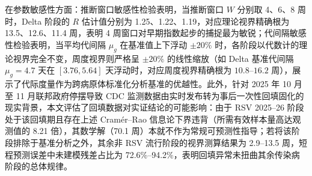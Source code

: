 \documentclass[11pt,a4paper]{article}
\theoremstyle{plain}
\theoremstyle{definition}
\begin{document}
在参数敏感性方面：推断窗口敏感性检验表明，当推断窗口 $W$ 分别取 4、6、8 周时，Delta 阶段的 $R$ 估计值分别为 1.25、1.22、1.19，对应理论视界精确根为 13.5、12.6、11.4 周，表明 4 周窗口对早期指数起步的捕捉最为敏锐；代间隔敏感性检验表明，当平均代间隔 $\mu_g$ 在基准值上下浮动 $\pm 20\%$ 时，各阶段以代数计的理论视界完全不变，周度视界则严格呈 $\pm 20\%$ 的线性缩放（如 Delta 基准代间隔 $\mu_g = 4.7$ 天在 $[3.76, 5.64]$ 天浮动时，对应周度视界精确根为 $10.8\text{--}16.2$ 周），展示了代际度量作为跨病原体标准化分析基准的优越性。此外，针对 2025 年 10 月至 11 月联邦政府停摆导致 CDC 监测数据由实时发布转为事后一次性回填固化的现实背景，本文评估了回填数据对实证结论的可能影响：由于 RSV 2025--26 阶段处于该回填期且存在上述 Cram\'er--Rao 信息论下界违背（所需有效样本量高达观测值的 8.21 倍），其数学解（70.1 周）本就不作为常规可预测性指导；若将该阶段排除于基准分析之外，其余非 RSV 流行阶段的视界测算结果为 2.9--13.5 周，短程预测误差中未建模残差占比为 72.6\%--94.2\%，表明回填异常未扭曲其余传染病阶段的总体规律。
\end{document}
